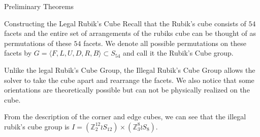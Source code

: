 \documentclass[final]{beamer}
\newlength{\colwidth}
\begin{document}
\begin{frame}[t]
\begin{columns}[t]
\begin{column}{\colwidth}
\begin{exampleblock}{Preliminary Theorems}
\begin{itemize}






    \end{itemize}

  \end{exampleblock}
  

  \begin{block}{Constructing the Legal Rubik's Cube}
    Recall that the Rubik's cube consists of $54$ facets and the entire set of arrangements of the rubiks cube can be thought of as permutations of these $54$ facets. 
    We denote all possible permutations on these facets by $G = \langle F,L,U,D,R,B\rangle \subset S_{54}$ and call it the Rubik's Cube group.


    
    Unlike the legal Rubik's Cube Group, the Illegal Rubik’s Cube Group allows the solver to take the cube apart and rearrange the facets.  
    We also notice that some orientations are theoretically possible but can not be physically realized on the cube. 

    From the description of the corner and edge cubes, we can see that the illegal rubik's cube group is $I = (\mathbb Z^{12}_2 \wr S_{12}) \times (\mathbb Z^8_3 \wr S_8)$.




\end{block}
\end{column}
\end{columns}
\end{frame}
\end{document}
